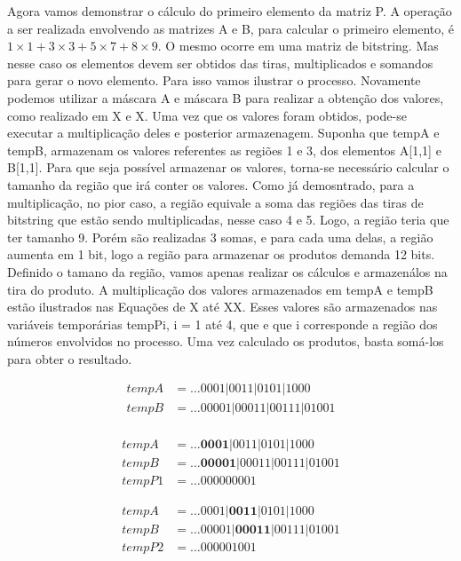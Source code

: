 \documentclass[12pt]{article}
\begin{document}
Agora vamos demonstrar o cálculo do primeiro elemento da matriz P. A operação a
ser realizada envolvendo as matrizes A e B, para calcular o primeiro elemento, é
$1 \times 1 + 3 \times 3 + 5 \times 7 + 8 \times 9$. O mesmo ocorre em uma
matriz de bitstring. Mas nesse caso os elementos devem ser obtidos das tiras,
multiplicados e somandos para gerar o novo elemento. Para isso vamos ilustrar o
processo. Novamente podemos utilizar a máscara A e máscara B para realizar a
obtenção dos valores, como realizado em X e X. Uma vez que os valores foram
obtidos, pode-se executar a multiplicação deles e posterior armazenagem. Suponha
que tempA e tempB, armazenam os valores referentes as regiões 1 e 3, dos
elementos A[1,1] e B[1,1]. Para que seja possível armazenar os valores, torna-se
necessário calcular o tamanho da região que irá conter os valores. Como já
demosntrado, para a multiplicação, no pior caso, a região equivale a soma das
regiões das tiras de bitstring que estão sendo multiplicadas, nesse caso 4 e 5.
Logo, a região teria que ter tamanho 9. Porém são realizadas 3 somas, e para
cada uma delas, a região aumenta em 1 bit, logo a região para armazenar os
produtos demanda 
12 bits. Definido o tamano da região, vamos apenas realizar os cálculos e
armazenálos na tira do produto. A multiplicação dos valores armazenados em tempA
e tempB estão ilustrados nas Equações de  X até XX. Esses valores são
armazenados nas variáveis temporárias tempPi, i = 1 até 4, que e que i
corresponde a região dos números envolvidos no processo. Uma vez calculado os
produtos, basta somá-los para obter o resultado. 

\begin{align*}
 tempA&= \ldots0001|0011|0101|1000\\
 tempB&= \ldots00001|00011|00111|01001\\
\end{align*}

\begin{align*}
 tempA&= \ldots\textbf{0001}|0011|0101|1000\\
 tempB&= \ldots\textbf{00001}|00011|00111|01001\\
 tempP1&= \ldots000000001
\end{align*}

\begin{align*}
 tempA&= \ldots0001|\textbf{0011}|0101|1000\\
 tempB&= \ldots00001|\textbf{00011}|00111|01001\\
 tempP2&= \ldots000001001
\end{align*}
\end{document}
